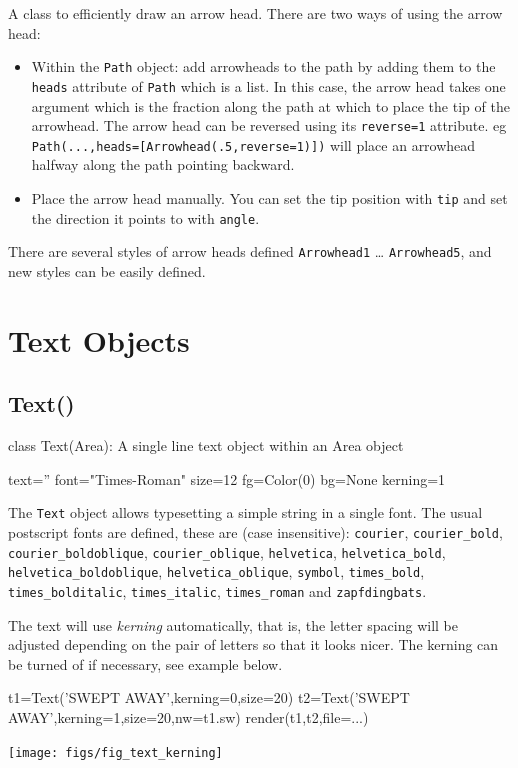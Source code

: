 \documentclass[a4paper]{book}
\begin{document}
A class to efficiently draw an arrow head. There are two ways of using the arrow head:
\begin{itemize}
\item Within the \Verb|Path| object: add arrowheads to the path by adding them
to the \Verb|heads| attribute of \Verb|Path| which is a list. In this case, the
arrow head takes one argument which is the fraction along the path at which to
place the tip of the arrowhead. The arrow head can be reversed using its
\Verb|reverse=1| attribute.  eg
\Verb|Path(...,heads=[Arrowhead(.5,reverse=1)])| will place an arrowhead
halfway along the path pointing backward.
\item Place the arrow head manually. You can set the tip position with
\Verb|tip| and set the direction it points to with \Verb|angle|.
\end{itemize}

There are several styles of arrow heads defined \Verb|Arrowhead1| \ldots
\Verb|Arrowhead5|, and new styles can be easily defined.



\section{Text Objects}

\subsection{Text()}
\label{sec:text}
\begin{python}
class Text(Area):
    A single line text object within an Area object
    
    text=''
    font="Times-Roman"
    size=12
    fg=Color(0)
    bg=None
    kerning=1
\end{python}
The \Verb|Text| object allows typesetting a simple string in a single
font. The usual postscript fonts are defined, these are (case
insensitive): \Verb|courier|, \Verb|courier_bold|,
\Verb|courier_boldoblique|, \Verb|courier_oblique|, \Verb|helvetica|,
\Verb|helvetica_bold|, \Verb|helvetica_boldoblique|,
\Verb|helvetica_oblique|, \Verb|symbol|, \Verb|times_bold|,
\Verb|times_bolditalic|, \Verb|times_italic|, \Verb|times_roman| and
\Verb|zapfdingbats|.

The text will use \emph{kerning} automatically, that is, the
letter spacing will be adjusted depending on the pair of letters so
that it looks nicer. The kerning can be turned of if necessary, see
example below.
\begin{example}
\begin{python}
t1=Text('SWEPT AWAY',kerning=0,size=20)
t2=Text('SWEPT AWAY',kerning=1,size=20,nw=t1.sw)
render(t1,t2,file=...)
\end{python}
\begin{center}
  \texttt{[image: figs/fig\_text\_kerning]}
\end{center}
\end{example}
\end{document}
